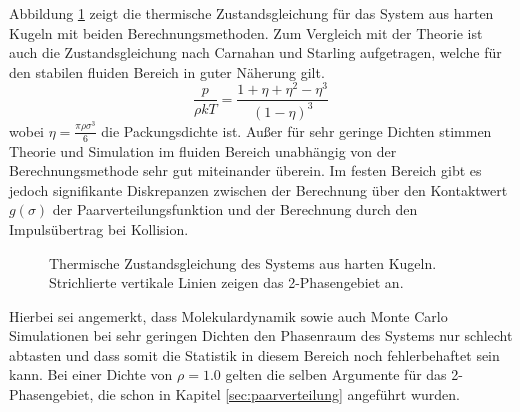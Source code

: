 Abbildung \ref{fig:zustandsgleichung} zeigt die thermische Zustandsgleichung für das System aus harten Kugeln mit beiden Berechnungsmethoden. Zum Vergleich mit der Theorie ist auch die Zustandsgleichung nach Carnahan und Starling \cite{Carnahan1969} aufgetragen, welche für den stabilen fluiden Bereich in guter Näherung gilt.
\begin{equation}
\frac{p}{\rho kT} = \frac{1 + \eta + \eta^2 -\eta^3}{(1 - \eta)^3}
\end{equation} 
wobei $\eta = \frac{\pi \rho \sigma^3}{6}$ die Packungsdichte ist. Außer für sehr geringe Dichten stimmen Theorie und Simulation im fluiden Bereich unabhängig von der Berechnungsmethode sehr gut miteinander überein. Im festen Bereich gibt es jedoch signifikante Diskrepanzen zwischen der Berechnung über den Kontaktwert $g(\sigma)$ der Paarverteilungsfunktion und der Berechnung durch den Impulsübertrag bei Kollision.   
\begin{figure}[H]
 \centering
  \resizebox{0.9\textwidth}{!}{}
 \caption{Thermische Zustandsgleichung des Systems aus harten Kugeln. Strichlierte vertikale Linien zeigen das 2-Phasengebiet an.}
 \label{fig:zustandsgleichung}
\end{figure} 
Hierbei sei angemerkt, dass Molekulardynamik sowie auch Monte Carlo Simulationen bei sehr geringen Dichten den Phasenraum des Systems nur schlecht abtasten und dass somit die Statistik in diesem Bereich noch fehlerbehaftet sein kann. Bei einer Dichte von $\rho = 1.0 $ gelten die selben Argumente für das 2-Phasengebiet, die schon in Kapitel \ref{sec:paarverteilung} angeführt wurden. 

